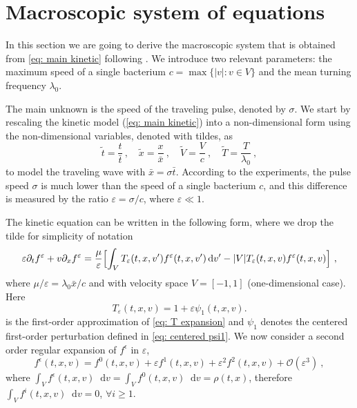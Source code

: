 \documentclass[11pt,twoside]{article}
\numberwithin{equation}{section}
\newcommand*\diff{\mathop{}\!\mathrm{d}}
\theoremstyle{plain}
\theoremstyle{nonumberplain}
\newcommand{\e}{\epsilon}
\begin{document}
\section{Macroscopic system of equations}\label{sec: maro system}
In this section we are going to derive the macroscopic system that is obtained from \eqref{eq: main kinetic} following \cite{saragosti2010mathematical}. We introduce two relevant parameters: the maximum speed of a single bacterium $c = \max\{|v|: v \in V\}$ and the mean turning frequency $\lambda_0$.

The main unknown is the speed of the traveling pulse, denoted by $\sigma$. We start by rescaling the kinetic model (\ref{eq: main kinetic}) into a non-dimensional form using the non-dimensional variables, denoted with tildes, as
\begin{equation}
    \tilde{t}= \frac{{t}}{\bar{t}}\ , \quad \tilde{x} = \frac{x}{\bar{x}}\ , \quad {\tilde{V} = \frac{V}{c}}\ , \quad \tilde{T}=\frac{T}{\lambda_0}\ ,
    \nonumber
\end{equation}
to model the traveling wave with $\bar{x} = \sigma\bar{t}$. According to the experiments, the pulse
speed $\sigma$ is much lower than the speed of a single bacterium $c$, and this difference is measured by the ratio $\varepsilon = \sigma / c$, where $\varepsilon \ll 1$.



The kinetic equation can be written in the following form, where we  drop the tilde for simplicity of notation 
{
\begin{equation}
    \varepsilon \partial_t f^\varepsilon+{v}\partial_x f^\varepsilon = \frac{\mu}{\varepsilon}\Bigl[\int_V T_\varepsilon(t,x,v')f^\varepsilon(t,x,v')\diff v'-|V|T_\varepsilon(t,x,v)f^\varepsilon(t,x,v)\Bigr]\ , \label{eq: inital model with scaling}
\end{equation}}where $\mu/\varepsilon=\lambda_0 \bar{x}/c$ and with velocity space \( V = [-1,1] \) (one-dimensional case). 
Here 
\begin{equation}\label{eq: T app}
T_\varepsilon(t,x,v)
=
1+\varepsilon\psi_1(t,x,v).
\end{equation} 
is the first-order approximation of \eqref{eq: T expansion}
{and \(\psi_1\) denotes the centered first-order perturbation defined in \eqref{eq: centered psi1}.}
We now consider a second order regular expansion of $f^\e$ in $\varepsilon$, 
\begin{equation*}
f^\e(t,{x},{v})=f^0(t,{x},{v})+\varepsilon f^1(t,{x},{v})+\varepsilon^2 f^2(t,{x},{v})+\mathcal{O}(\varepsilon^3)\ , 
\end{equation*}
where $\int_V f^\e(t,{x},{v})\diff {v} = \int_V f^0(t,{x},{v})\diff {v} = \rho(t,{x})$, therefore $\int_V f^i(t,{x},{v})\diff {v}=0$, $\forall i\geq 1$.
\end{document}
